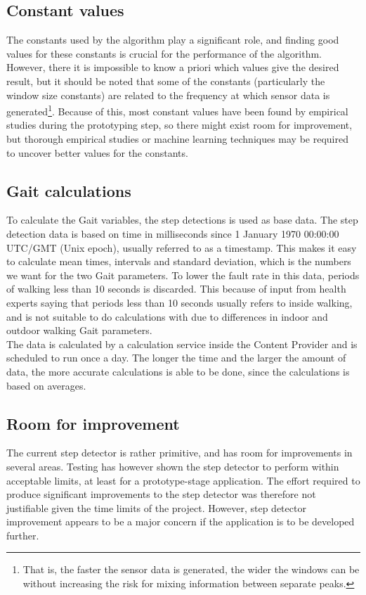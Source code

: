 \subsection{Constant values}
\label{constant_values}
The constants used by the algorithm play a significant role, and finding good values for these constants is crucial for the performance of the algorithm. However, there it is impossible to know a priori which values give the desired result, but it should be noted that some of the constants (particularly the window size constants) are related to the frequency at which sensor data is generated\footnote{That is, the faster the sensor data is generated, the wider the windows can be without increasing the risk for mixing information between separate peaks.}. Because of this, most constant values have been found by empirical studies during the prototyping step, so there might exist room for improvement, but thorough empirical studies or machine learning techniques may be required to uncover better values for the constants.

\subsection{Gait calculations}
To calculate the Gait variables, the step detections is used as base data. The step detection data is based on time in milliseconds since 1 January 1970 00:00:00 UTC/GMT (Unix epoch), usually referred to as a timestamp. This makes it easy to calculate mean times, intervals and standard deviation, which is the numbers we want for the two Gait parameters. To lower the fault rate in this data, periods of walking less than 10 seconds is discarded. This because of input from health experts saying that periods less than 10 seconds usually refers to inside walking, and is not suitable to do calculations with due to differences in indoor and outdoor walking Gait parameters.\\
The data is calculated by a calculation service inside the Content Provider and is scheduled to run once a day. The longer the time and the larger the amount of data, the more accurate calculations is able to be done, since the calculations is based on averages.

\subsection{Room for improvement}
\label{step_detector_improvements}
The current step detector is rather primitive, and has room for improvements in several areas. Testing has however shown the step detector to perform within acceptable limits, at least for a prototype-stage application. The effort required to produce significant improvements to the step detector was therefore not justifiable given the time limits of the project. However, step detector improvement appears to be a major concern if the application is to be developed further.

